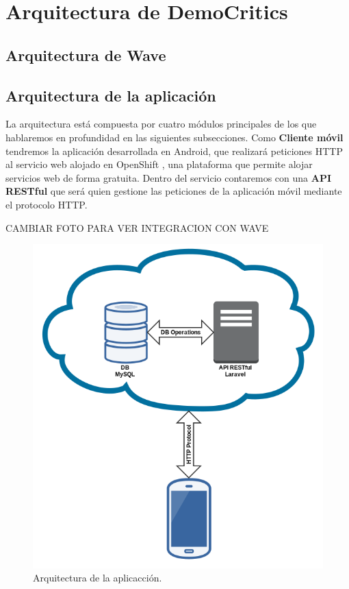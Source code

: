\newpage
\thispagestyle{sectioned}
\chapter{Arquitectura de DemoCritics}

\section{Arquitectura de Wave}

\section{Arquitectura de la aplicación}

La arquitectura está compuesta por cuatro módulos principales de los que hablaremos en profundidad en las siguientes subsecciones. Como \textbf{Cliente móvil} tendremos la aplicación desarrollada en Android, que realizará peticiones HTTP al servicio web alojado en OpenShift \cite{ref:OpenShift}, una plataforma que permite alojar servicios web de forma gratuita. Dentro del servicio contaremos con una \textbf{API RESTful} que será quien gestione las peticiones de la aplicación móvil mediante el protocolo HTTP.

CAMBIAR FOTO PARA VER INTEGRACION CON WAVE

\begin{figure}[H]
\centering
\includegraphics[keepaspectratio, scale=0.4]{Media/Captures/architecture.png}
\caption{Arquitectura de la aplicacción.}
\label{fig:architecture}
\end{figure}

